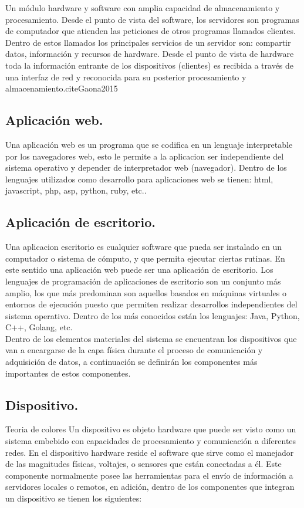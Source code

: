 Un módulo hardware y software con amplia capacidad de almacenamiento y procesamiento. Desde el punto de vista del software, los servidores son programas de computador que atienden las peticiones de otros programas llamados clientes. Dentro de estos llamados los principales servicios de un servidor son: compartir datos, información y recursos de hardware. Desde el punto de vista de hardware toda la información entrante de los dispositivos (clientes) es recibida a través de una interfaz de red y reconocida para su posterior procesamiento y almacenamiento.cite{Gaona2015}

\subsection{Aplicación web.}

Una aplicación web es un programa que se codifica en un lenguaje interpretable por los navegadores web, esto le permite a la aplicacion ser independiente del sistema operativo y depender de interpretador web (navegador). Dentro de los lenguajes utilizados como desarrollo para aplicaciones web se tienen: html, javascript, php, asp, python, ruby, etc.\cite{Gaona2015}.

\subsection{Aplicación de escritorio.} 

Una aplicacion escritorio es cualquier software que pueda ser instalado en un computador o sistema de cómputo, y que permita ejecutar ciertas rutinas. En este sentido una aplicación web puede ser una aplicación de escritorio. Los lenguajes de programación de aplicaciones de escritorio son un conjunto más amplio, los que más predominan son aquellos basados en máquinas virtuales o entornos de ejecución puesto que permiten realizar desarrollos independientes del sistema operativo. Dentro de los más conocidos están los lenguajes: Java, Python, C++, Golang, etc.
\vspace{0.5cm}\\
Dentro de los elementos materiales del sistema se encuentran los dispositivos que van a encargarse de la capa física durante el proceso de comunicación y adquisición de datos, a continuación se definirán los componentes más importantes de estos componentes.

\subsection{Dispositivo.} Teoria de colores
Un dispositivo es objeto hardware que puede ser visto como un sistema embebido con capacidades de procesamiento y comunicación a diferentes redes. En el dispositivo hardware reside el software que sirve como el manejador de las magnitudes físicas, voltajes, o sensores que están conectadas a él. Este componente normalmente posee las herramientas para el envío de información a servidores locales o remotos, en adición, dentro de los componentes que integran un dispositivo se tienen los siguientes:

